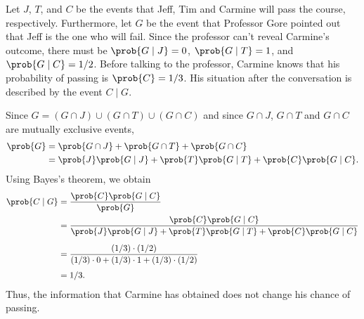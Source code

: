 Let $J$, $T$, and $C$ be the events that Jeff, Tim and Carmine will pass the course, respectively.
Furthermore, let $G$ be the event that Professor Gore pointed out that Jeff is the one who will fail.
Since the professor can't reveal Carmine's outcome, there must be $\prob{G\mid J}=0$, $\prob{G\mid T}=1$, and $\prob{G\mid C}=1/2$.
Before talking to the professor, Carmine knows that his probability of passing is $\prob{C}=1/3$.
His situation after the conversation is described by the event $C\mid G$.

Since $G=(G\cap J)\cup(G\cap T)\cup(G\cap C)$ and since $G\cap J$, $G\cap T$ and $G\cap C$ are mutually exclusive events,
\begin{align*}
    \prob{G} &= \prob{G\cap J}+\prob{G\cap T}+\prob{G\cap C} \\
    &= \prob{J}\prob{G\mid J}+\prob{T}\prob{G\mid T}+\prob{C}\prob{G\mid C}.
\end{align*}
Using Bayes's theorem, we obtain
\begin{align*}
    \prob{C\mid G} &= \frac{\prob{C}\prob{G\mid C}}{\prob{G}} \\
    &= \frac{\prob{C}\prob{G\mid C}}{\prob{J}\prob{G\mid J}+\prob{T}\prob{G\mid T}+\prob{C}\prob{G\mid C}} \\[2mm]
    &= \frac{(1/3)\cdot(1/2)}{(1/3)\cdot0+(1/3)\cdot1+(1/3)\cdot(1/2)} \\[1mm]
    &= 1/3.
\end{align*}
Thus, the information that Carmine has obtained does not change his chance of passing.
